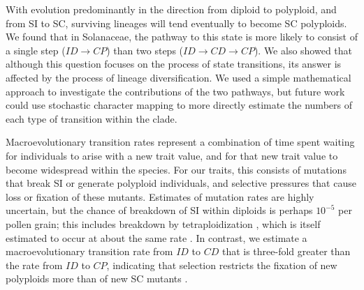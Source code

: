 With evolution predominantly in the direction from diploid to polyploid, and from SI to SC, surviving lineages will tend eventually to become SC polyploids.
We found that in Solanaceae, the pathway to this state is more likely to consist of a single step ($ID \rightarrow CP$) than two steps ($ID \rightarrow CD \rightarrow CP$).
We also showed that although this question focuses on the process of state transitions, its answer is affected by the process of lineage diversification.
We used a simple mathematical approach to investigate the contributions of the two pathways, but future work could use stochastic character mapping to more directly estimate the numbers of each type of transition within the clade.

Macroevolutionary transition rates represent a combination of time spent waiting for individuals to arise with a new trait value, and for that new trait value to become widespread within the species.
For our traits, this consists of mutations that break SI or generate polyploid individuals, and selective pressures that cause loss or fixation of these mutants.
Estimates of mutation rates are highly uncertain, but the chance of breakdown of SI within diploids is perhaps $10^{-5}$ per pollen grain; this includes breakdown by tetraploidization \citep{lewis1979}, which is itself estimated to occur at about the same rate \citep{ramsey_1998}.  %
In contrast, we estimate a macroevolutionary transition rate from $ID$ to $CD$ that is three-fold greater than the rate from $ID$ to $CP$, indicating that selection restricts the fixation of new polyploids more than of new SC mutants \citep{robertson_2011}. %

